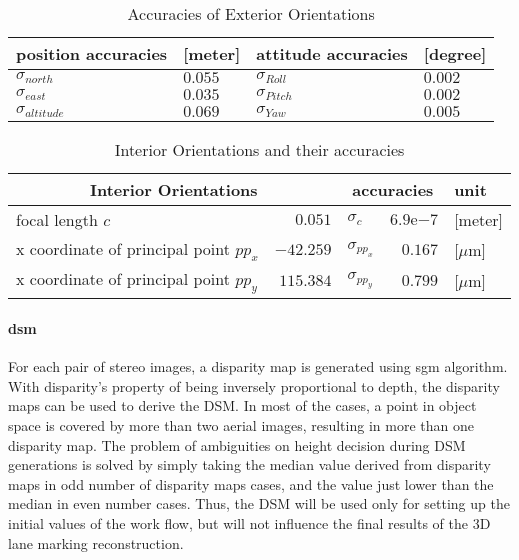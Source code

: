 
\begin{table}%
    \centering
    \begin{tabular}{ll|ll}
    \toprule
    position accuracies  &[meter]  & attitude accuracies & [degree]\\
    \midrule
    $\sigma_{north}$     & $0.055$ & $\sigma_{Roll}$  & $0.002$\\
    $\sigma_{east}$      & $0.035$ & $\sigma_{Pitch}$ & $0.002$\\
    $\sigma_{altitude}$  & $0.069$ & $\sigma_{Yaw}$   & $0.005$\\
    \bottomrule
    \end{tabular}
    \caption{Accuracies of Exterior Orientations}
    \label{tab:EOaccuracy}
\end{table}

\begin{table}%
    \centering
    \begin{tabular}{lr|lr|l}
    \toprule
    \multicolumn{2}{c|}{Interior Orientations}  & \multicolumn{2}{c|}{accuracies} & unit\\
    \midrule
    focal length $c$                       &   $0.051$ & $\sigma_c$      & $6.9\mathrm{e}{-7}$ & [meter]\\
    x coordinate of principal point $pp_x$ & $-42.259$ & $\sigma_{pp_x}$ & $0.167$             &[$\mu$m]\\
    x coordinate of principal point $pp_y$ & $115.384$ & $\sigma_{pp_y}$ & $0.799$             &[$\mu$m]\\
    \bottomrule
    \end{tabular}
    \caption{Interior Orientations and their accuracies}
    \label{tab:IOaccuracy}
\end{table}

\clearpage
\paragraph{\gls{dsm}}
For each pair of stereo images, a disparity map is generated using \gls{sgm} algorithm. With disparity's property of being inversely proportional to depth, the disparity maps can be used to derive the DSM. In most of the cases, a point in object space is covered by more than two aerial images, resulting in more than one disparity map. The problem of ambiguities on height decision during DSM generations is solved by simply taking the median value derived from disparity maps in odd number of disparity maps cases, and the value just lower than the median in even number cases. %
Thus, the DSM will be used only for setting up the initial values of the work flow, but will not influence the final results of the 3D lane marking reconstruction.

